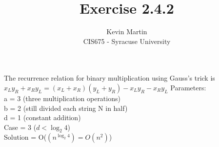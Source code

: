 \documentclass{article}
\author{Kevin Martin\\ CIS675 - Syracuse University}
\title{Exercise 2.4.2}
\begin{document}
\maketitle

The recurrence relation for binary multiplication using Gauss's trick is \(x_{L}y_{R}+x_{R}y_{L}=(x_{L}+x_{R})(y_{L}+y_{R})-x_{L}y_{R}-x_{R}y_{L}\)
Parameters:\\
a = 3 (three multiplication operations)\\
b = 2 (still divided each string N in half)\\
d = 1 (constant addition)\\
Case = 3 (\(d < \log_2 4\))\\
Solution = O(\((n^{\log_2 4}) = O(n^2)\))\\
\end{document}
